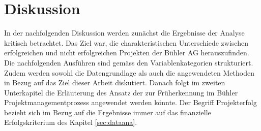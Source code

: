 \chapter{Diskussion}\label{sec:disk}
In der nachfolgenden Diskussion werden zunächst die Ergebnisse der Analyse kritisch betrachtet. Das Ziel war, die charakteristischen Unterschiede zwischen erfolgreichen und nicht erfolgreichen Projekten der Bühler AG herauszufinden. Die nachfolgenden Ausführen sind gemäss den Variablenkategorien strukturiert. Zudem werden sowohl die Datengrundlage als auch die angewendeten Methoden in Bezug auf das Ziel dieser Arbeit diskutiert. Danach folgt im zweiten Unterkapitel die Erläuterung des Ansatz der zur Früherkennung im Bühler Projektmanagementprozess angewendet werden könnte. Der Begriff Projekterfolg bezieht sich im Bezug auf die Ergebnisse immer auf das finanzielle Erfolgskriterium des Kapitel \ref{sec:dataana}.
\newline
